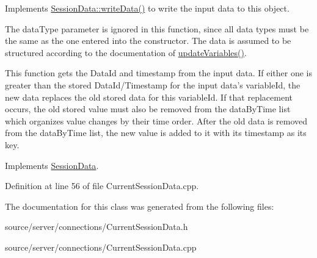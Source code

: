 Implements \hyperlink{class_session_data_ad05a594d8410d638f1a066bfa5a10ba3}{Session\-Data\-::write\-Data()} to write the input data to this object. 

The data\-Type parameter is ignored in this function, since all data types must be the same as the one entered into the constructor. The data is assumed to be structured according to the documentation of \hyperlink{class_current_session_data_abd0e52b87a97c937baa8075ed36c05a8}{update\-Variables()}.

This function gets the Data\-Id and timestamp from the input data. If either one is greater than the stored Data\-Id/\-Timestamp for the input data's variable\-Id, the new data replaces the old stored data for this variable\-Id. If that replacement occurs, the old stored value must also be removed from the data\-By\-Time list which organizes value changes by their time order. After the old data is removed from the data\-By\-Time list, the new value is added to it with its timestamp as its key. 

Implements \hyperlink{class_session_data_ad05a594d8410d638f1a066bfa5a10ba3}{Session\-Data}.



Definition at line 56 of file Current\-Session\-Data.\-cpp.



The documentation for this class was generated from the following files\-:\begin{DoxyCompactItemize}
\item 
source/server/connections/Current\-Session\-Data.\-h\item 
source/server/connections/Current\-Session\-Data.\-cpp\end{DoxyCompactItemize}
